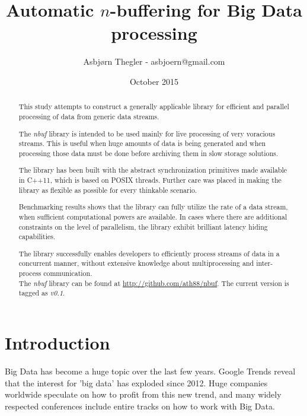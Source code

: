 \documentclass[a4paper]{article}
\title{Automatic $n$-buffering for Big Data processing}
\author{Asbj\o rn Thegler - asbjoern@gmail.com}
\date{October 2015}
\newcommand{\nbuf}{\textit{nbuf} }
\begin{document}
\maketitle

\sloppy

\begin{abstract}
\begin{doublespace}
This study attempts to construct a generally applicable library for efficient and parallel processing of data from generic data streams.

The \nbuf library is intended to be used mainly for live processing of very voracious streams. This is useful when huge amounts of data is being generated and when processing those data must be done before archiving them in slow storage solutions.

The library has been built with the abstract synchronization primitives made available in C++11, which is based on POSIX threads. Further care was placed in making the library as flexible as possible for every thinkable scenario.

Benchmarking results shows that the library can fully utilize the rate of a data stream, when sufficient computational powers are available. In cases where there are additional constraints on the level of parallelism, the library exhibit brilliant latency hiding capabilities.

The library successfully enables developers to efficiently process streams of data in a concurrent manner, without extensive knowledge about multiprocessing and inter-process communication.\\

The \nbuf library can be found at \url{http://github.com/ath88/nbuf}. The current version is tagged as \textit{v0.1}.

\end{doublespace}
\end{abstract}

\newpage
\tableofcontents

\newpage
{}
\section{Introduction}
Big Data has become a huge topic over the last few years. Google Trends reveal that the interest for 'big data' has exploded since 2012. Huge companies worldwide speculate on how to profit from this new trend, and many widely respected conferences include entire tracks on how to work with Big Data.\\
\end{document}
